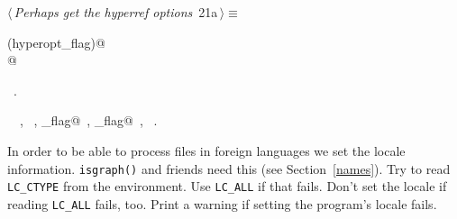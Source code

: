 \documentclass[a4paper]{report}
\begin{document}
\begin{flushleft} \small
\begin{minipage}{\linewidth}\label{scrap29}\raggedright\small
{} $\langle\,${\it Perhaps get the hyperref options}\nobreak\ {\footnotesize {21a}}$\,\rangle\equiv$
\vspace{-1ex}
\begin{list}{}{} \item
\mbox{}\verb@if (hyperopt_flag)@\\
\mbox{}@\\
\mbox{}\verb@@{\NWsep}
\end{list}
\vspace{-1.5ex}
\footnotesize
\begin{list}{}{\setlength{\itemsep}{-\parsep}\setlength{\itemindent}{-\leftmargin}}
\item \NWtxtMacroRefIn\ .
\item \NWtxtIdentsUsed\nobreak\  \verb@FALSE@\nobreak\ , \verb@hyperoptions@\nobreak\ , \verb@hyperopt_flag@\nobreak\ , \verb@hyperref_flag@\nobreak\ , \verb@TRUE@\nobreak\ .
\item{}
\end{list}
\end{minipage}\vspace{4ex}
\end{flushleft}
In order to be able to process files in foreign languages we
set the locale information. \texttt{isgraph()} and friends need
this (see Section~\ref{names}).
Try to read \texttt{LC\_CTYPE} from the environment. Use \texttt{LC\_ALL}
if that fails. Don't set the locale if reading \texttt{LC\_ALL} fails, too.
Print a warning if setting the program's locale fails.
\end{document}
